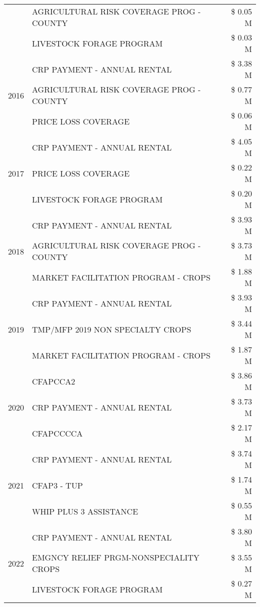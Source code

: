 \begin{tabular}{llr}
 & AGRICULTURAL RISK COVERAGE PROG - COUNTY & \$ 0.05 M \\
 & LIVESTOCK FORAGE PROGRAM & \$ 0.03 M \\
\cline{1-3}
\multirow[t]{3}{*}{2016} & CRP PAYMENT - ANNUAL RENTAL & \$ 3.38 M \\
 & AGRICULTURAL RISK COVERAGE PROG - COUNTY & \$ 0.77 M \\
 & PRICE LOSS COVERAGE & \$ 0.06 M \\
\cline{1-3}
\multirow[t]{3}{*}{2017} & CRP PAYMENT - ANNUAL RENTAL & \$ 4.05 M \\
 & PRICE LOSS COVERAGE & \$ 0.22 M \\
 & LIVESTOCK FORAGE PROGRAM & \$ 0.20 M \\
\cline{1-3}
\multirow[t]{3}{*}{2018} & CRP PAYMENT - ANNUAL RENTAL & \$ 3.93 M \\
 & AGRICULTURAL RISK COVERAGE PROG - COUNTY & \$ 3.73 M \\
 & MARKET FACILITATION PROGRAM - CROPS & \$ 1.88 M \\
\cline{1-3}
\multirow[t]{3}{*}{2019} & CRP PAYMENT - ANNUAL RENTAL & \$ 3.93 M \\
 & TMP/MFP 2019 NON SPECIALTY CROPS & \$ 3.44 M \\
 & MARKET FACILITATION PROGRAM - CROPS & \$ 1.87 M \\
\cline{1-3}
\multirow[t]{3}{*}{2020} & CFAPCCA2 & \$ 3.86 M \\
 & CRP PAYMENT - ANNUAL RENTAL & \$ 3.73 M \\
 & CFAPCCCCA & \$ 2.17 M \\
\cline{1-3}
\multirow[t]{3}{*}{2021} & CRP PAYMENT - ANNUAL RENTAL & \$ 3.74 M \\
 & CFAP3 - TUP & \$ 1.74 M \\
 & WHIP PLUS 3 ASSISTANCE & \$ 0.55 M \\
\cline{1-3}
\multirow[t]{3}{*}{2022} & CRP PAYMENT - ANNUAL RENTAL & \$ 3.80 M \\
 & EMGNCY RELIEF PRGM-NONSPECIALITY CROPS & \$ 3.55 M \\
 & LIVESTOCK FORAGE PROGRAM & \$ 0.27 M \\
\cline{1-3}
\bottomrule
\end{tabular}
